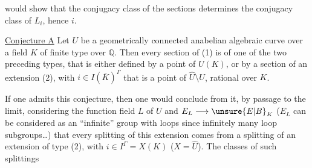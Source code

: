 would show that the conjugacy class of the sections determines the conjugacy class of $L_i$, hence $i$.

\uline{Conjecture A} Let $U$ be a geometrically connected anabelian algebraic curve over a field $K$ of finite type over $\mathbb{Q}$. Then every section of (1) is  of one of the two preceding types, that is either defined by a point of $U(K)$, or by a section of an extension (2), with $i\in I(\bar K)^\Gamma$ that is a point of $\widehat U\setminus U$, rational over $K$.

If one admits this conjecture, then one would conclude from it, by passage to the limit, considering the function field $L$ of $U$ and $E_L\longrightarrow \unsure{E|B}_K$ ($E_L$ can be considered as an ``infinite'' group with loops since infinitely many  loop subgroups\ldots) that every splitting of this extension comes from a splitting of an extension of type (2), with $i\in I^\Gamma=X(K)$ ($X=\widehat U$). The classes of such splittings
